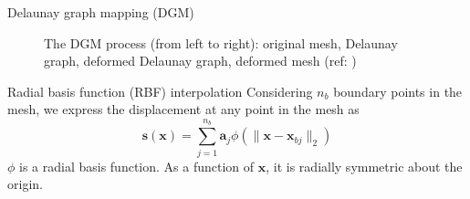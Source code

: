 \documentclass[t,12pt]{beamer}
\let\bld\boldsymbol
\begin{document}
\begin{frame}{Delaunay graph mapping (DGM)}
\begin{figure}
{ 	}
 	\caption{The DGM process (from left to right): original mesh, Delaunay graph, deformed Delaunay graph, deformed mesh (ref: )}
 	\label{fig:dgmprocess}
 \end{figure}
\end{frame}

\begin{frame}{Radial basis function (RBF) interpolation}
Considering $n_b$ boundary points in the mesh, we express the displacement at any point in the mesh as 
\begin{equation}
\mathbf{s}(\mathbf{x}) = \sum_{j=1}^{n_b} \mathbf{a}_j \phi(\lVert\mathbf{x} - \mathbf{x}_{bj}\rVert_2)
\label{eqn:rbf}
\end{equation}
$\phi$ is a radial basis function. As a function of $\bld{x}$, it is radially symmetric about the origin.
\end{frame}
\end{document}
